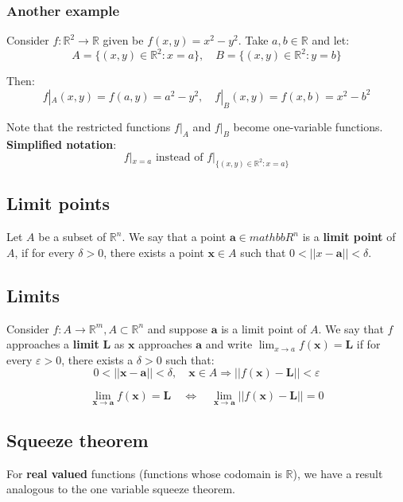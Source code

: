 \documentclass[11pt]{article}
\begin{document}
\subsubsection{Another example}
\label{sec:orgfb752a7}
Consider \(f : \mathbb{R}^2 \rightarrow \mathbb{R}\) given be \(f(x, y) = x^2 - y^2\). Take \(a, b \in \mathbb{R}\) and let:
\[A = \{(x, y) \in \mathbb{R}^2 : x = a\}, \quad B = \{(x, y) \in \mathbb{R}^2 : y = b\}\]

Then:
\[f|_A (x, y) = f(a, y) = a^2 - y^2, \quad f|_B (x, y) = f(x, b) = x^2 - b^2\]

Note that the restricted functions \(f|_A\) and \(f|_B\) become one-variable functions.
\\[0pt]

\textbf{Simplified notation}:
\[f|_{x = a} \text{ instead of } f|_{\{(x, y) \in \mathbb{R}^2 : x = a\}}\]

\subsection{Limit points}
\label{sec:org2939b07}
Let \(A\) be a subset of \(\mathbb{R}^n\). We say that a point \(\boldsymbol{a} \in mathbb{R}^n\) is a \textbf{limit point} of \(A\), if for every \(\delta > 0\), there exists a point \(\boldsymbol{x} \in A\) such that \(0 < ||x - \boldsymbol{a}|| < \delta\).

\subsection{Limits}
\label{sec:org3c24e86}
Consider \(f : A \rightarrow \mathbb{R}^m, A \subset \mathbb{R}^n\) and suppose \(\boldsymbol{a}\) is a limit point of \(A\). We say that \(f\) approaches a \textbf{limit} \(\boldsymbol{L}\) as \(\boldsymbol{x}\) approaches \(\boldsymbol{a}\) and write \(\lim_{x \rightarrow a} f(\boldsymbol{x}) = \boldsymbol{L}\) if for every \(\varepsilon > 0\), there exists a \(\delta > 0\) such that:
\[0 < ||\boldsymbol{x} - \boldsymbol{a}|| < \delta, \quad \boldsymbol{x} \in A \Rightarrow ||f(\boldsymbol{x}) - \boldsymbol{L}|| < \varepsilon\]

\[\lim_{\boldsymbol{x} \rightarrow \boldsymbol{a}} f(\boldsymbol{x}) = \boldsymbol{L} \quad \Leftrightarrow \quad \lim_{\boldsymbol{x} \rightarrow \boldsymbol{a}} ||f(\boldsymbol{x}) - \boldsymbol{L}|| = 0\]

\subsection{Squeeze theorem}
\label{sec:orgc52a3c9}
For \textbf{real valued} functions (functions whose codomain is \(\mathbb{R}\)), we have a result analogous to the one variable squeeze theorem.
\\[0pt]
\end{document}
